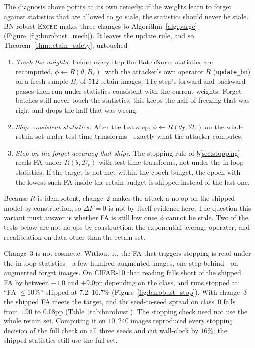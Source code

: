 \documentclass{article}
\newcommand{\ours}{\textsc{Excise}}
\newcommand{\Dr}{\mathcal{D}_r}
\theoremstyle{remark}
\theoremstyle{plain}
\begin{document}
The diagnosis above points at its own remedy: if the weights learn to forget
against statistics that are allowed to go stale, the statistics should never be
stale. BN-robust \ours{} makes three changes to Algorithm~\ref{alg:purge}
(Figure~\ref{fig:bnrobust_mech}). It leaves the update rule, and so
Theorem~\ref{thm:retain_safety}, untouched.
\begin{enumerate}
\item \emph{Track the weights.} Before every step the BatchNorm statistics are
recomputed, $\phi \leftarrow R(\theta, B_r)$, with the attacker's own operator
$R$ (\texttt{update\_bn}) on a fresh sample $B_r$ of $512$ retain images. The
step's forward and backward passes then run under statistics consistent with the
current weights. Forget batches still never touch the statistics: this keeps
the half of freezing that was right and drops the half that was wrong.
\item \emph{Ship consistent statistics.} After the last step,
$\phi \leftarrow R(\theta_T, \Dr)$ on the whole retain set under test-time
transforms---exactly what the attacker computes.
\item \emph{Stop on the forget accuracy that ships.} The stopping rule of
\S\ref{sec:stopping} reads FA under $R(\theta, \Dr)$ with test-time transforms,
not under the in-loop statistics. If the target is not met within the epoch
budget, the epoch with the lowest such FA inside the retain budget is shipped
instead of the last one.
\end{enumerate}
Because $R$ is idempotent, change~2 makes the attack a no-op on the shipped model
by construction, so $\Delta F = 0$ is not by itself evidence here. The question
this variant must answer is whether FA is still low once $\phi$ cannot be
stale. Two of the tests below are not no-ops by construction: the
exponential-average operator, and recalibration on data other than the retain
set.

Change~3 is not cosmetic. Without it, the FA that triggers stopping is read under
the in-loop statistics---a few hundred augmented images, one step behind---on
augmented forget images. On CIFAR-10 that reading falls short of the shipped FA
by between $-1.0$ and $+9.0$pp depending on the class, and runs stopped at
``FA $\le 10\%$'' shipped at $7.2$--$16.7\%$ (Figure~\ref{fig:bnrobust_stop}). With change~3 the shipped FA meets
the target, and the seed-to-seed spread on class~0 falls from $1.90$ to
$0.08$pp (Table~\ref{tab:bnrobust}). The stopping check need not use the whole
retain set. Computing it on $10{,}240$ images reproduced every stopping decision
of the full check on all three seeds and cut wall-clock by $16\%$; the shipped
statistics still use the full set.
\end{document}
